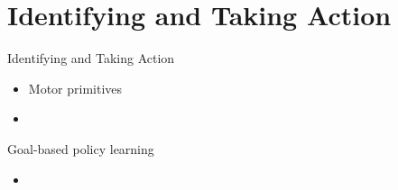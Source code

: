 \section{Identifying and Taking Action}
Identifying and Taking Action

\begin{itemize}
	\item Motor primitives 
	\item \todo{}
\end{itemize}

Goal-based policy learning
\begin{itemize}
	\item 
\end{itemize}